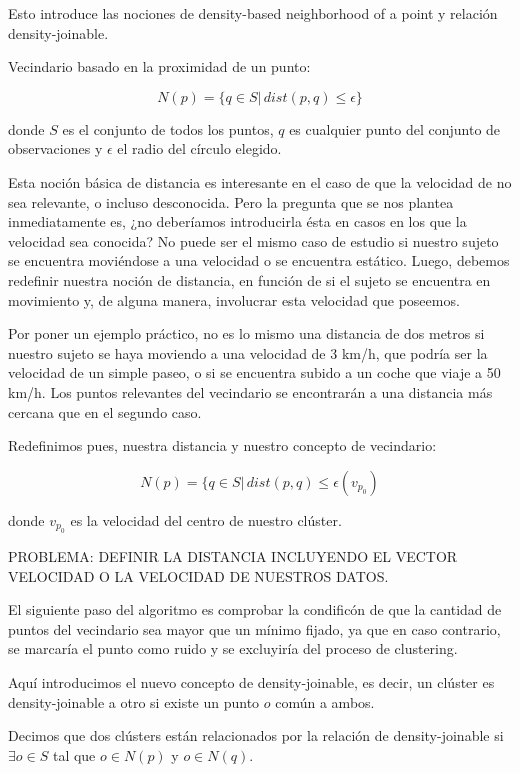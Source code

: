 \documentclass[a4paper,12pt]{article}
\begin{document}
Esto introduce las nociones de density-based neighborhood of a point y relaci\'on density-joinable. 

Vecindario basado en la proximidad de un punto:


$$ N(p) = \{q\in S | \, dist(p, q) \leq \epsilon\}$$

donde $S$ es el conjunto de todos los puntos, $q$ es cualquier punto del conjunto de observaciones y $\epsilon$ el radio del c\'irculo elegido. 


Esta noci\'on b\'asica de distancia es interesante en el caso de que la velocidad de no sea relevante, o incluso desconocida. Pero la pregunta que se nos plantea inmediatamente es, ¿no deber\'iamos introducirla \'esta en casos en los que la velocidad sea conocida? No puede ser el mismo caso de estudio si nuestro sujeto se encuentra moviéndose a una velocidad o se encuentra estático. Luego, debemos redefinir nuestra noción de distancia, en función de si el sujeto se encuentra en movimiento y, de alguna manera, involucrar esta velocidad que poseemos. 

Por poner un ejemplo práctico, no es lo mismo una distancia de dos metros si nuestro sujeto se haya moviendo a una velocidad de 3 km/h, que podr\'ia ser la velocidad de un simple paseo, o si se encuentra subido a un coche que viaje a 50 km/h. Los puntos relevantes del vecindario se encontrarán a una distancia más cercana que en el segundo caso. 

Redefinimos pues, nuestra distancia y nuestro concepto de vecindario:


$$ N(p) = \{ q\in S | \, dist(p, q)\leq \epsilon(v_{p_0})$$ 

donde $v_{p_0}$ es la velocidad del centro de nuestro clúster. 


PROBLEMA: DEFINIR LA DISTANCIA INCLUYENDO EL VECTOR VELOCIDAD O LA VELOCIDAD DE NUESTROS DATOS. 

El siguiente paso del algoritmo es comprobar la condificón de que la cantidad de puntos del vecindario sea mayor que un mínimo fijado, ya que en caso contrario, se marcaría el punto como ruido y se excluyiría del proceso de clustering. 

Aquí introducimos el nuevo concepto de density-joinable, es decir, un clúster es density-joinable a otro si existe un punto $o$ común a ambos.

Decimos que dos cl\'usters est\'an relacionados por la relaci\'on de density-joinable si $\exists o\in S$ tal que $o\in N(p)$ y $o\in N(q)$.
\end{document}
